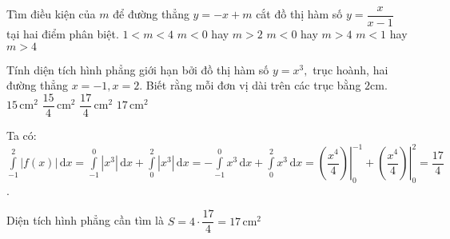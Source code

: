 \begin{ex}%
	Tìm điều kiện của $m$ để đường thẳng $y=-x+m$ cắt đồ thị hàm số  $y=\dfrac{x}{x-1}$ tại hai điểm phân biệt.
	\choice
	{$1<m<4$}
	{$m<0$ hay $m>2$}
	{\True $m<0$ hay $m>4$}
	{$m<1$ hay $m>4$}
\end{ex}

\begin{ex}%
	Tính diện tích hình phẳng giới hạn bởi đồ thị hàm số $ y = x^3, $ trục hoành, hai đường thẳng $ x= -1, x = 2.$ Biết rằng mỗi đơn vị dài trên các trục bằng $2\mathrm{cm}.$
	\choice
	{$15\mathrm{\,cm} ^2$}
	{$\dfrac{15}{4}\mathrm{\,cm}^2$}
	{$\dfrac{17}{4}\mathrm{\,cm}^2$}
	{\True $17\mathrm{\,cm}^2$ }
	\loigiai
	{Ta có: $\displaystyle\int\limits_{-1}^2 \left|f(x)\right|\mathrm{\,d}x = \displaystyle\int\limits_{-1}^0 \left|x^3\right|\mathrm{\,d}x + \displaystyle\int\limits_{0}^2 \left|x^3\right|\mathrm{\,d}x = - \displaystyle\int\limits_{-1}^0 x^3\mathrm{\,d}x + \displaystyle\int\limits_{0}^2 x^3\mathrm{\,d}x 
		= \left. \left(\dfrac{x^4}{4}\right) \right|_0^{-1} + \left. \left(\dfrac{x^4}{4}\right) \right|_0^{2} = \dfrac{17}{4}$.	
		
		Diện tích hình phẳng cần tìm là $S=4\cdot\dfrac{17}{4}=17\mathrm{\,cm}^2$		
	}
\end{ex}


